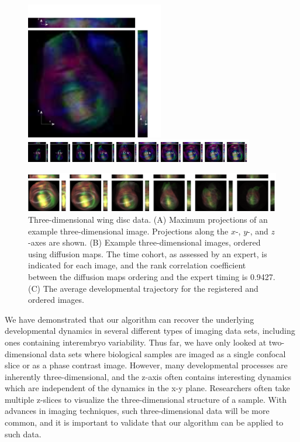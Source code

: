 \documentclass[twocolumn, 10pt]{article}
\begin{document}
\begin{figure}[t]
\includegraphics[width=6cm]{wing_disc_example}
%
\hfill
%
\includegraphics[width=10cm]{wing_disc_ordered}

\vspace{0.25cm}
\includegraphics[width=17.5cm]{wing_disc_average}

\caption{Three-dimensional wing disc data. (A) Maximum projections of an example three-dimensional image. Projections along the $x$-, $y$-, and $z$-axes are shown. (B) Example three-dimensional images, ordered using diffusion maps. The time cohort, as assessed by an expert, is indicated for each image, and the rank correlation coefficient between the diffusion maps ordering and the expert timing is 0.9427. (C) The average developmental trajectory for the registered and ordered images. }
\label{fig:wing_disc}
\end{figure}

We have demonstrated that our algorithm can recover the underlying developmental dynamics in several different types of imaging data sets, including ones containing interembryo variability. 
%
Thus far, we have only looked at two-dimensional data sets where biological samples are imaged as a single confocal slice or as a phase contrast image. 
%
However, many developmental processes are inherently three-dimensional, and the z-axis often contains interesting dynamics which are independent of the dynamics in the x-y plane. 
%
Researchers often take multiple z-slices to visualize the three-dimensional structure of a sample.
%
With advances in imaging techniques, such three-dimensional data will be more common, and it is important to validate that our algorithm can be applied to such data. 
\end{document}

